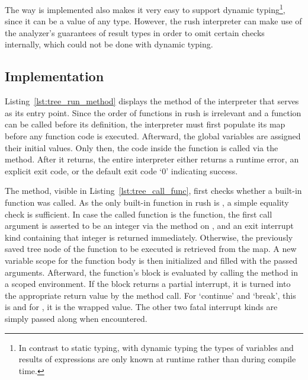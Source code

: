 The way  is implemented also makes it very easy to support dynamic typing\footnote{In contrast to static typing, with dynamic typing the types of variables and results of expressions are only known at runtime rather than during compile time.}, since it can be a value of any type.
However, the rush interpreter can make use of the analyzer's guarantees of result types in order to omit certain checks internally, which could not be done with dynamic typing.

\subsection{Implementation}


Listing~\ref{lst:tree_run_method} displays the  method of the interpreter that serves as its entry point.
Since the order of functions in rush is irrelevant and a function can be called before its definition, the interpreter must first populate its  map before any function code is executed.
Afterward, the global variables are assigned their initial values.
Only then, the code inside the  function is called via the  method.
After it returns, the entire interpreter either returns a runtime error, an explicit exit code, or the default exit code `0' indicating success.

The  method, visible in Listing~\ref{lst:tree_call_func}, first checks whether a built-in function was called.
As the only built-in function in rush is , a simple equality check is sufficient.
In case the called function is the  function, the first call argument is asserted to be an integer via the  method on , and an exit interrupt kind containing that integer is returned immediately.
Otherwise, the previously saved tree node of the function to be executed is retrieved from the  map.
A new variable scope for the function body is then initialized and filled with the passed arguments.
Afterward, the function's block is evaluated by calling the  method in a scoped environment.
If the block returns a partial interrupt, it is turned into the appropriate return value by the  method call.
For `continue' and `break', this is \qVerb{()} and for , it is the wrapped value.
The other two fatal interrupt kinds are simply passed along when encountered.

